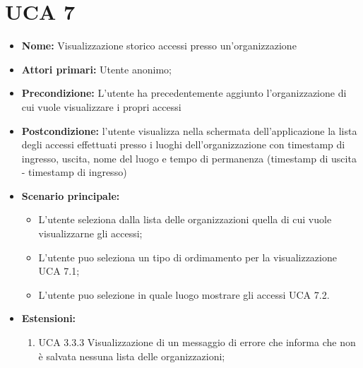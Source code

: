 \section{UCA 7}%
\begin{itemize}
\item \textbf{Nome:} Visualizzazione storico accessi presso un’organizzazione
\item \textbf{Attori primari:} Utente anonimo;
\item \textbf{Precondizione:} L’utente ha precedentemente aggiunto l’organizzazione di cui vuole visualizzare i propri accessi 
\item \textbf{Postcondizione:} l’utente visualizza nella schermata dell’applicazione la lista degli accessi effettuati presso i luoghi dell’organizzazione con timestamp di ingresso, uscita, nome del luogo e tempo di permanenza (timestamp di uscita - timestamp di ingresso)
\item \textbf{Scenario principale:} 
\begin{itemize}
\item L’utente seleziona dalla lista delle organizzazioni quella di cui vuole visualizzarne gli accessi;
\item L'utente puo seleziona un tipo di ordimamento per la visualizzazione UCA 7.1;
\item L'utente puo selezione in quale luogo mostrare gli accessi UCA 7.2.
\end{itemize}
\item \textbf{Estensioni:}
\begin{enumerate}
	\item UCA 3.3.3 Visualizzazione di un messaggio di errore che informa che non è salvata nessuna lista delle organizzazioni;	
\end{enumerate}	
\end{itemize}


